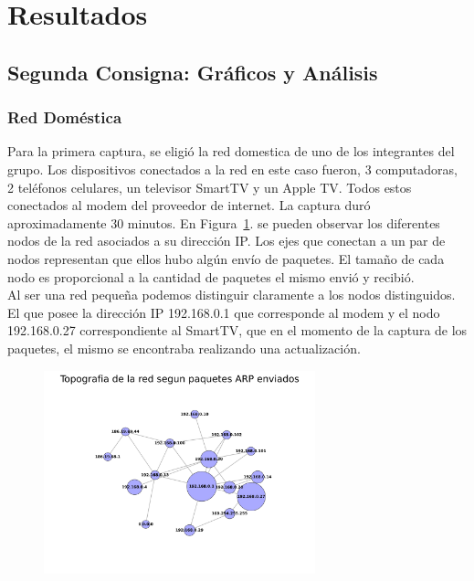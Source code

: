 \section{Resultados}

\subsection{Segunda Consigna: Gráficos y Análisis}

\subsubsection{Red Doméstica}

Para la primera captura, se eligió la red domestica de uno de los integrantes del grupo. Los dispositivos conectados a la red en este caso fueron, 3 computadoras, 2 teléfonos celulares, un televisor SmartTV y un Apple TV. Todos estos conectados al modem del proveedor de internet.
La captura duró aproximadamente 30 minutos.
En Figura~\ref{fig:red_domestica_network}. se pueden observar los diferentes nodos de la red asociados a su dirección IP. Los ejes que conectan a un par de nodos representan que ellos hubo algún envío de paquetes. El tamaño de cada nodo es proporcional a la cantidad de paquetes el mismo envió y recibió.
\\
Al ser una red pequeña podemos distinguir claramente a los nodos distinguidos. El que posee la dirección IP 192.168.0.1 que corresponde al modem y el nodo 192.168.0.27 correspondiente al SmartTV, que en el momento de la captura de los paquetes, el mismo se encontraba realizando una actualización.

\begin{figure}[h!]
  \centering
   \includegraphics[width=0.7\textwidth]{graficos/red_domestica_network.png}
  \caption{}
  \label{fig:red_domestica_network}
\end{figure}

